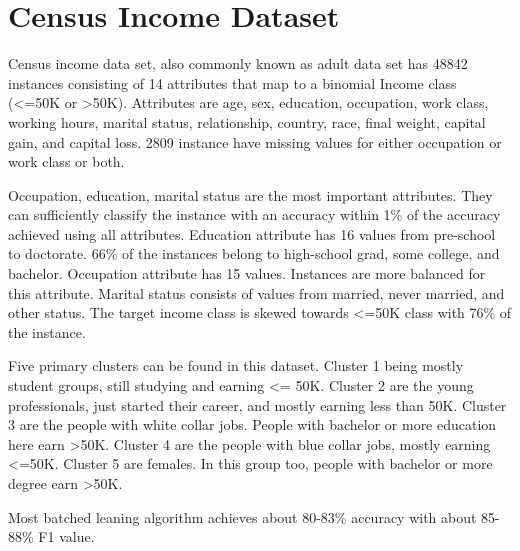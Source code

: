 \chapter{Census Income Dataset}
\label{appndx:ci}

Census income data set, also commonly known as adult data set has 48842 instances consisting of 14 attributes that map to a binomial Income class (<=50K or >50K). Attributes are age, sex, education, occupation, work class, working hours, marital status, relationship, country, race, final weight, capital gain, and capital loss. 2809 instance have missing values for either occupation or work class or both.

Occupation, education, marital status are the most important attributes. They can sufficiently classify the instance with an accuracy within 1\% of the accuracy achieved using all attributes. Education attribute has 16 values from pre-school to doctorate. 66\% of the instances belong to high-school grad, some college, and bachelor. Occupation attribute has 15 values. Instances are  more balanced for this attribute. Marital status consists of values from married, never married, and other status. The target income class is skewed towards <=50K class with 76\% of the instance.

Five primary clusters can be found in this dataset. Cluster 1 being mostly student groups, still studying and earning <= 50K. Cluster 2 are the young professionals, just started their career, and mostly earning less than 50K. Cluster 3 are the people with white collar jobs. People with bachelor or more education here earn >50K. Cluster 4 are the people with blue collar jobs, mostly earning <=50K. Cluster 5 are females. In this group too, people with bachelor or more degree earn >50K.

Most batched leaning algorithm achieves about 80-83\% accuracy with about 85-88\% F1 value.